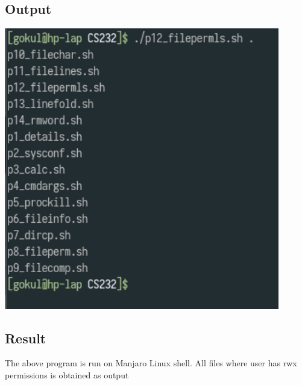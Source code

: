 \documentclass{article}
\begin{document}
\subsection{Output}
\includegraphics[width=0.9\textwidth]{img/p16.png}\newline

\subsection{Result}
The above program is run on Manjaro Linux shell. All files where user
has rwx permissions is obtained as output
\end{document}
